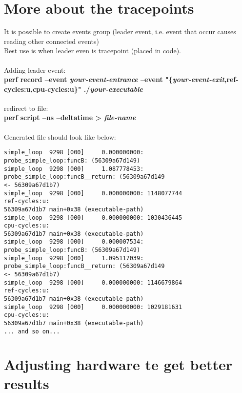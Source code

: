 \documentclass[11pt,onecolumn]{article}
\begin{document}
\newpage

\section{More about the tracepoints}

It is possible to create events group (leader event, i.e. event that occur causes reading other connected events)\\
Best use is when leader even is tracepoint (placed in code).\\\\
Adding leader event:\\
\textbf{perf record --event \textit{your-event-entrance} --event "\{\textit{your-event-exit},ref-cycles:u,cpu-cycles:u\}" ./\textit{your-executable}}\\\\
redirect to file:\\
\textbf{perf script --ns --deltatime > \textit{file-name}}\\\\
Generated file should look like below:
\begin{verbatim}
simple_loop  9298 [000]     0.000000000:         probe_simple_loop:funcB: (56309a67d149)
simple_loop  9298 [000]     1.087778453: probe_simple_loop:funcB__return: (56309a67d149
<- 56309a67d1b7)
simple_loop  9298 [000]     0.000000000: 1148077744                    ref-cycles:u:      
56309a67d1b7 main+0x38 (executable-path)
simple_loop  9298 [000]     0.000000000: 1030436445                    cpu-cycles:u:      
56309a67d1b7 main+0x38 (executable-path)
simple_loop  9298 [000]     0.000007534:         probe_simple_loop:funcB: (56309a67d149)
simple_loop  9298 [000]     1.095117039: probe_simple_loop:funcB__return: (56309a67d149
<- 56309a67d1b7)
simple_loop  9298 [000]     0.000000000: 1146679864                    ref-cycles:u:      
56309a67d1b7 main+0x38 (executable-path)
simple_loop  9298 [000]     0.000000000: 1029181631                    cpu-cycles:u:      
56309a67d1b7 main+0x38 (executable-path)
... and so on...
\end{verbatim}

\newpage
\section{Adjusting hardware te get better results}
\end{document}
